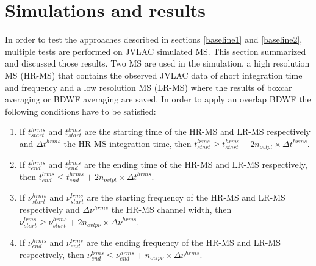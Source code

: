 \documentclass[useAMS,usenatbib]{mn2e}
\begin{document}
\section{Simulations and results}
In order to test the approaches described in sections \ref{baseline1} and \ref{baseline2}, multiple tests are performed on JVLAC 
simulated MS. This section summarized and discussed those results. Two MS are used in 
the simulation, a high resolution MS (HR-MS) that contains the observed JVLAC data of short integration time and frequency and a low 
resolution 
MS (LR-MS) where the results of boxcar averaging or BDWF averaging are saved. In order to apply an overlap BDWF  the following 
conditions have to be satisfied:
\begin{enumerate}
 \item If $t^{hrms}_{start}$ and $t^{lrms}_{start}$ are the starting time of the HR-MS and LR-MS respectively and  $\Delta t^{hrms}$ the 
HR-MS integration time, then 
	    $t^{lrms}_{start}\geq t^{hrms}_{start} + 2n_{ovlpt}\times \Delta t^{hrms}$. 
  \item If $t^{hrms}_{end}$ and $t^{lrms}_{end}$ are the ending time of the HR-MS and LR-MS respectively, then 
	    $t^{lrms}_{end}\leq t^{hrms}_{end} + 2n_{ovlpt}\times \Delta t^{hrms}$. 
 \item If $\nu^{hrms}_{start}$ and $\nu^{lrms}_{start}$ are the starting frequency of the HR-MS and LR-MS respectively and  $\Delta 
\nu^{hrms}$ the HR-MS channel width, then 
	    $\nu^{lrms}_{start} \geq \nu^{hrms}_{start} + 2n_{ovlp\nu}\times \Delta \nu^{hrms}$. 
 \item If $\nu^{hrms}_{end}$ and $\nu^{lrms}_{end}$ are the ending frequency of the HR-MS and LR-MS respectively, then 
	    $\nu^{lrms}_{end} \leq \nu^{hrms}_{end} + n_{ovlp\nu}\times \Delta \nu^{hrms}$. 
\end{enumerate}
\end{document}
